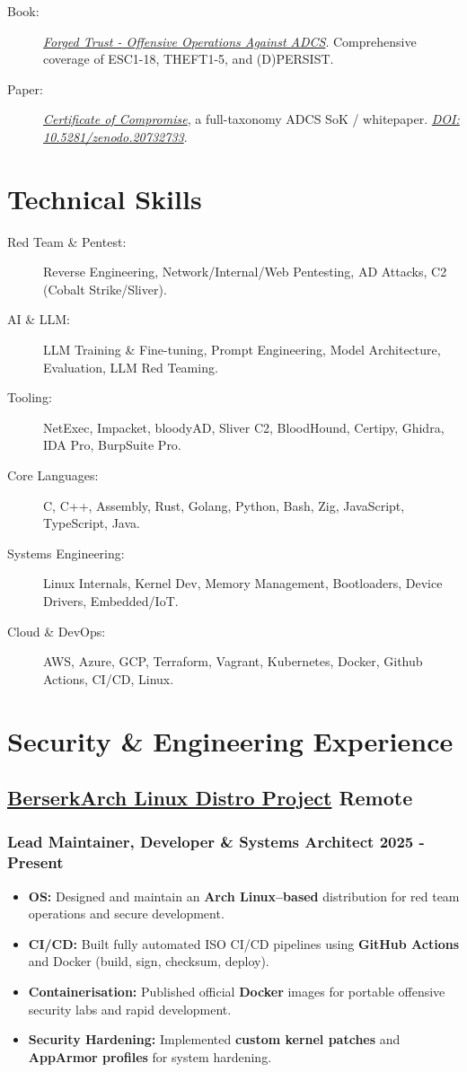 \documentclass[10pt]{article}
\newcommand{\resumeSubheading}[4]{
    \subsection*{#1 \hfill #2}
    \subsubsection*{#3 \hfill #4}
    \vspace{2pt}
}
\begin{document}
\begin{description}
  \item[Book:] \href{https://www.amazon.com/Forged-Trust-Offensive-Operations-Certificate/dp/9360120405}{\textit{Forged Trust - Offensive Operations Against ADCS}}. Comprehensive coverage of ESC1-18, THEFT1-5, and (D)PERSIST.
  \item[Paper:] \href{https://github.com/thehackersbrain/certificate-of-compromise}{\textit{Certificate of Compromise}}, a full-taxonomy ADCS SoK / whitepaper. \href{https://zenodo.org/records/20732733}{\textit{DOI: 10.5281/zenodo.20732733}}.
\end{description}

\section{Technical Skills}

\begin{description}
  \item[Red Team \& Pentest:] Reverse Engineering, Network/Internal/Web Pentesting, AD Attacks, C2 (Cobalt Strike/Sliver).
  \item[AI \& LLM:] LLM Training \& Fine-tuning, Prompt Engineering, Model Architecture, Evaluation, LLM Red Teaming.
	\item[Tooling:] NetExec, Impacket, bloodyAD, Sliver C2, BloodHound, Certipy, Ghidra, IDA Pro, BurpSuite Pro.
	\item[Core Languages:] C, C++, Assembly, Rust, Golang, Python, Bash, Zig, JavaScript, TypeScript, Java.
	\item[Systems Engineering:] Linux Internals, Kernel Dev, Memory Management, Bootloaders, Device Drivers, Embedded/IoT.
	\item[Cloud \& DevOps:] AWS, Azure, GCP, Terraform, Vagrant, Kubernetes, Docker, Github Actions, CI/CD, Linux.
\end{description}

\section{Security \& Engineering Experience}

\resumeSubheading
{\href{https://berserkarch.org}{BerserkArch Linux Distro Project}}{Remote}
{Lead Maintainer, Developer \& Systems Architect}{2025 - Present}
\begin{itemize}
	\item \textbf{OS:} Designed and maintain an \textbf{Arch Linux–based} distribution for red team operations and secure development.
	\item \textbf{CI/CD:} Built fully automated ISO CI/CD pipelines using \textbf{GitHub Actions} and Docker (build, sign, checksum, deploy).
	\item \textbf{Containerisation:} Published official \textbf{Docker} images for portable offensive security labs and rapid development.
	\item \textbf{Security Hardening:} Implemented \textbf{custom kernel patches} and \textbf{AppArmor profiles} for system hardening.
\end{itemize}
\end{document}
